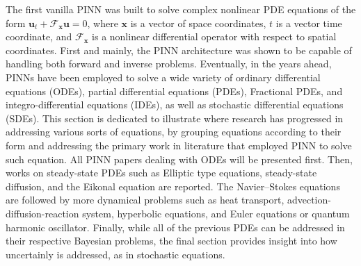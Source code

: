 \documentclass[pdflatex,sn-basic]{sn-jnl}%
\theoremstyle{thmstyleone}%
\theoremstyle{thmstyletwo}%
\theoremstyle{thmstylethree}%
\begin{document}
The first vanilla PINN \citep{Rai2019_PhysicsInformedNeural_PerRPK} was built to solve complex nonlinear PDE equations of the form $\bm{u}_t + \mathcal{F}_{\bm{x}}\bm{u} = 0$,
 where $\bm{x}$  is a vector of space coordinates, $t$ is a vector time coordinate, and $\mathcal{F}_{\bm{x}}$ is a nonlinear differential operator with respect to spatial coordinates.
First and mainly, the PINN architecture was shown to be capable of handling both forward and inverse problems.
Eventually, in the years ahead, PINNs have been employed to solve a wide variety of ordinary differential equations (ODEs), partial differential equations (PDEs), Fractional PDEs, and integro-differential equations (IDEs), as well as stochastic differential equations (SDEs). 
%
%
This section is dedicated to illustrate where research has progressed in addressing various sorts of equations, by grouping equations according to their form and addressing the primary work in literature that employed PINN to solve such equation. 
All PINN papers dealing with ODEs will be presented first. 
Then, works on steady-state PDEs such as Elliptic type equations, steady-state diffusion, and the Eikonal equation are reported.
The Navier--Stokes equations are followed by more dynamical problems such as heat transport, advection-diffusion-reaction system, hyperbolic equations, and Euler equations or quantum harmonic oscillator.
Finally, while all of the previous PDEs can be addressed in their respective Bayesian problems, the final section provides insight into how uncertainly is addressed, as in  stochastic equations. 


\end{document}
